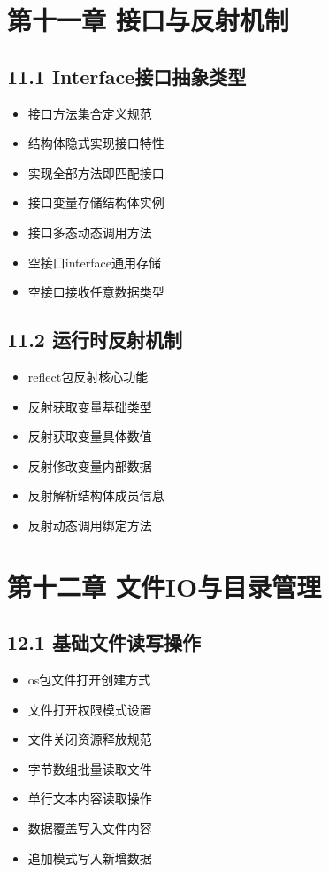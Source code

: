 \section{第十一章 接口与反射机制}
\subsection{11.1 Interface接口抽象类型}
\begin{itemize}
\item 接口方法集合定义规范
\item 结构体隐式实现接口特性
\item 实现全部方法即匹配接口
\item 接口变量存储结构体实例
\item 接口多态动态调用方法
\item 空接口interface{}通用存储
\item 空接口接收任意数据类型
\end{itemize}

\subsection{11.2 运行时反射机制}
\begin{itemize}
\item reflect包反射核心功能
\item 反射获取变量基础类型
\item 反射获取变量具体数值
\item 反射修改变量内部数据
\item 反射解析结构体成员信息
\item 反射动态调用绑定方法
\end{itemize}

\section{第十二章 文件IO与目录管理}
\subsection{12.1 基础文件读写操作}
\begin{itemize}
\item os包文件打开创建方式
\item 文件打开权限模式设置
\item 文件关闭资源释放规范
\item 字节数组批量读取文件
\item 单行文本内容读取操作
\item 数据覆盖写入文件内容
\item 追加模式写入新增数据
\end{itemize}

